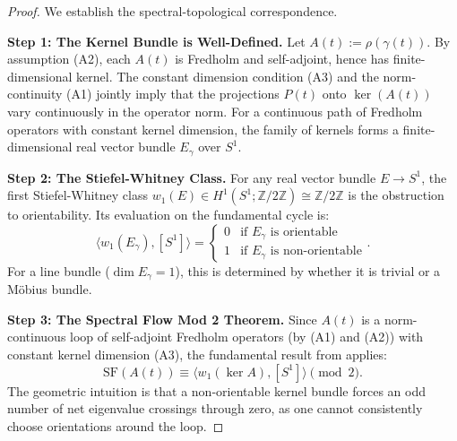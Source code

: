 \documentclass[11pt]{article}
\begin{document}
\begin{proof}
We establish the spectral-topological correspondence.

\medskip\noindent
\textbf{Step 1: The Kernel Bundle is Well-Defined.}
Let $A(t) := \rho(\gamma(t))$. By assumption (A2), each $A(t)$ is Fredholm and self-adjoint, hence has finite-dimensional kernel. The constant dimension condition (A3) and the norm-continuity (A1) jointly imply that the projections $P(t)$ onto $\ker(A(t))$ vary continuously in the operator norm. For a continuous path of Fredholm operators with constant kernel dimension, the family of kernels forms a finite-dimensional real vector bundle $E_\gamma$ over $S^1$.

\medskip\noindent
\textbf{Step 2: The Stiefel-Whitney Class.}
For any real vector bundle $E \to S^1$, the first Stiefel-Whitney class $w_1(E) \in H^1(S^1; \mathbb{Z}/2\mathbb{Z}) \cong \mathbb{Z}/2\mathbb{Z}$ is the obstruction to orientability. Its evaluation on the fundamental cycle is:
\[
\langle w_1(E_\gamma), [S^1] \rangle =
\begin{cases}
0 & \text{if } E_\gamma \text{ is orientable} \\
1 & \text{if } E_\gamma \text{ is non-orientable}
\end{cases}.
\]
For a line bundle ($\dim E_\gamma = 1$), this is determined by whether it is trivial or a Möbius bundle.

\noindent\textbf{Step 3: The Spectral Flow Mod 2 Theorem.}
Since $A(t)$ is a norm-continuous loop of self-adjoint Fredholm operators (by (A1) and (A2)) with constant kernel dimension (A3), the fundamental result from \cite{atiyah1975spectral, phillips1996spectral} applies:
\[
\mathrm{SF}(A(t)) \equiv \langle w_1(\ker A), [S^1] \rangle \pmod{2}.
\]
The geometric intuition is that a non-orientable kernel bundle forces an odd number of net eigenvalue crossings through zero, as one cannot consistently choose orientations around the loop.
\end{proof}
\end{document}
